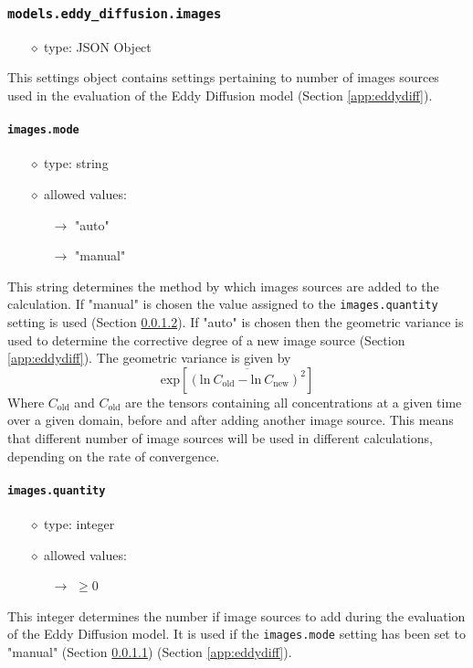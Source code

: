 \documentclass[]{article}
\def\code#1{\texttt{#1}}
\begin{document}
\subsubsection{\code{models.eddy\_diffusion.images}}
\begin{itemize}
    \item[$\diamond$] type: JSON Object 
\end{itemize}
This settings object contains settings pertaining to number of images sources
used in the evaluation of the Eddy Diffusion model (Section \ref{app:eddydiff}).

\paragraph{\code{images.mode}}\label{sec:imagemode}
\begin{itemize}
    \item[$\diamond$] type: string 
    \item[$\diamond$] allowed values:
    \begin{itemize}
        \item[$\rightarrow$] "auto"
        \item[$\rightarrow$] "manual"
    \end{itemize}
\end{itemize}
This string determines the method by which images sources are added to the
calculation. If "manual" is chosen the value assigned to the
\code{images.quantity} setting  is used (Section
\ref{sec:imagequant}). If "auto" is chosen then the geometric variance is used
to determine the corrective degree of a new image source (Section
\ref{app:eddydiff}). The geometric variance is given by
\begin{equation}
    \text{exp}\left[\overline{\left(\text{ln}~C_{\text{old}}-\text{ln}~C_{\text{new}}\right)^{2}}\right]
\end{equation}
Where $C_{\text{old}}$ and $C_{\text{old}}$ are the tensors containing all
concentrations at a given time over a given domain, before and after adding
another image source. This means that different number of image sources will be
used in different calculations, depending on the rate of convergence.


\paragraph{\code{images.quantity}}\label{sec:imagequant}
\begin{itemize}
    \item[$\diamond$] type: integer 
    \item[$\diamond$] allowed values:
    \begin{itemize}
        \item[$\rightarrow$] $\geq 0$
    \end{itemize}
\end{itemize}
This integer determines the number if image sources to add during the evaluation
of the Eddy Diffusion model. It is used if the
\code{images.mode} setting has been set to "manual"
(Section \ref{sec:imagemode}) (Section \ref{app:eddydiff}).
\end{document}
